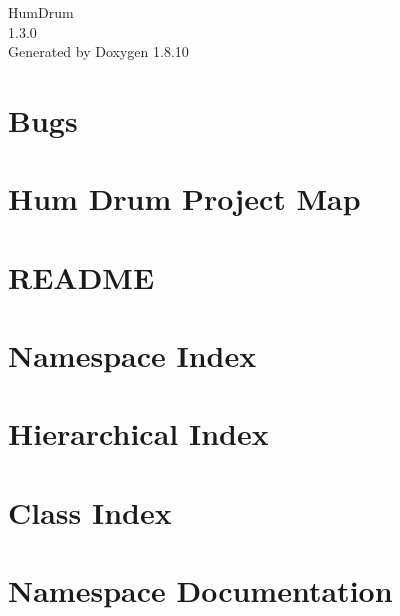 \documentclass[twoside]{book}
\newcommand{\+}{\discretionary{\mbox{\scriptsize$\hookleftarrow$}}{}{}}
\newcommand{\clearemptydoublepage}{%
  \newpage{\pagestyle{empty}\cleardoublepage}%
}
\begin{document}
\hypersetup{pageanchor=false,
             bookmarks=true,
             bookmarksnumbered=true,
             pdfencoding=unicode
            }
\begin{titlepage}
\vspace*{7cm}
\begin{center}%
{\Large Hum\+Drum \\[1ex]\large 1.\+3.\+0 }\\
\vspace*{1cm}
{\large Generated by Doxygen 1.8.10}\\
\end{center}
\end{titlepage}
\clearemptydoublepage
\tableofcontents
\clearemptydoublepage
{}
\hypersetup{pageanchor=true}

\chapter{Bugs}
\label{md_BUGS}
\hypertarget{md_BUGS}{}

\chapter{Hum Drum Project Map}
\label{md_MAP}
\hypertarget{md_MAP}{}

\chapter{R\+E\+A\+D\+M\+E}
\label{md_README}
\hypertarget{md_README}{}

\chapter{Namespace Index}

\chapter{Hierarchical Index}

\chapter{Class Index}

\chapter{Namespace Documentation}












\end{document}
